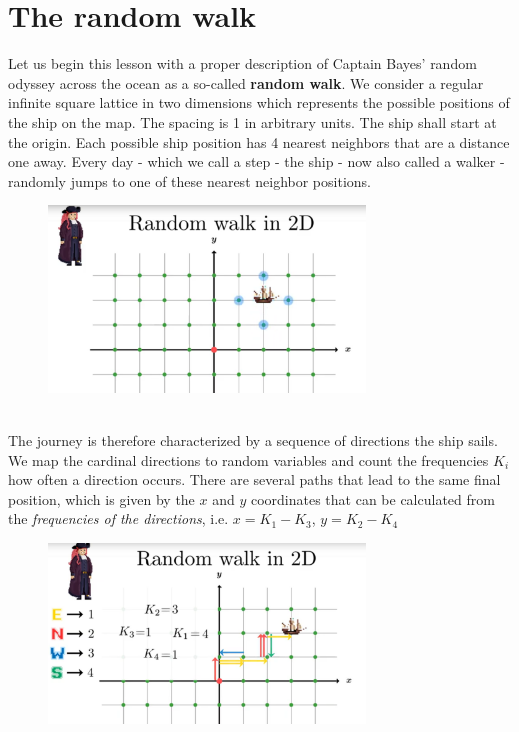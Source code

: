 \documentclass[12pt, a4paper]{scrartcl}
\begin{document}
\section*{The random walk}
Let us begin this lesson with a proper description of Captain Bayes' random odyssey across the ocean as a so-called \textbf{random walk}.
We consider a regular infinite square lattice in two dimensions which represents the possible positions of the ship on the map. The spacing is 1 in arbitrary units. The ship shall start at the origin. Each possible ship position has 4 nearest neighbors that are a distance one away. Every day - which we call a step - the ship - now also called a walker -  randomly jumps to one of these nearest neighbor positions. %
 \begin{figure}[H]
	\centering
	\includegraphics[width=0.75\textwidth]{5_1.png}
\end{figure}
\\[0.2cm]
The journey is therefore characterized by a sequence of directions the ship sails. 
We map the cardinal directions to random variables and count the frequencies $K_i$ how often a direction occurs.
There are several paths that lead to the same final position, which is given by the $x$ and $y$ coordinates that can be calculated from the \textit{frequencies of the directions}, i.e. $x = K_1-K_3$, $y=K_2-K_4$\\
 \begin{figure}[H]
	\centering
	\includegraphics[width=0.75\textwidth]{5_2.png}
\end{figure}
\end{document}
